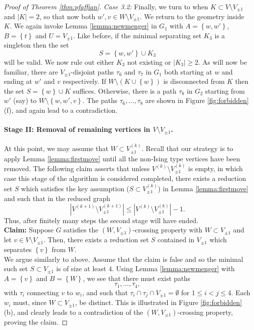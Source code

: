 \documentclass{article}
\numberwithin{equation}{section}
\theoremstyle{definition}
\theoremstyle{definition}
\theoremstyle{remark}
\newcommand{\Vis}{V_{\mathrm{Ising}}}
\renewcommand{\Vis}{V_{\pm 1}}
\renewcommand{\path}{\tau}
\begin{document}
\begin{proof}[Proof of Theorem \ref{thm:pfaffian}]
	\noindent\emph{Case 3.2: }Finally, we turn to when $K \subset V \setminus \Vis$ and $|K| = 2$, so that now both $w',v \in W \setminus \Vis$. 
	We return to the geometry inside $K$. We again invoke Lemma \ref{lemma:newmenger} in $G_1$ with $A = \left\{ w,w' \right\}$, $B = \left\{ t \right\}$ and $U = \Vis$. Like before, if the minimal separating set $K_3$ is a singleton then the set
	\[
	S = \left\{ w,w' \right\} \cup K_3
	\] 
	will be valid. We now rule out either $K_3$ not existing or $|K_3| \geq 2$. As will now be familiar, there are $\Vis$-disjoint paths $\tau_6$ and $\tau_7$ in $G_1$ both starting at $w$ and ending at $w'$ and $v$ respectively.  	
	If $W \setminus (K \cup \left\{ w \right\})$ is disconnected from $K$ then the set $S = \left\{ w \right\} \cup K$ suffices. Otherwise, there is a path $\tau_8$ in $G_2$ starting from $w'$ (say) to $ W \setminus \left\{ w,w',v \right\}$. The paths $\tau_6,\ldots,\tau_8$ are shown in Figure \ref{fig:forbidden} (f), and again lead to a contradiction.
	\paragraph{Stage II: Removal of remaining vertices in $V \setminus \Vis$. }
	At this point, we may assume that $W \subset \Vis^{(k)}$. Recall that our strategy is to apply Lemma \ref{lemma:firstmove} until all the non-Ising type vertices have been removed. The following claim asserts that unless $V^{(k)}\setminus\Vis^{(k)}$ is empty, in which case this stage of the algorithm is considered completed, there exists a reduction set $S$ which satisfies the key assumption ($S \subset \Vis^{(k)}$) in Lemma \ref{lemma:firstmove} and such that in the reduced graph
	\[
		| V^{(k+1)} \setminus \Vis^{(k+1)} | \leq | V^{(k)} \setminus \Vis^{(k)} | - 1.
	\]
	Thus, after finitely many steps the second stage will have ended.
	\\[1em]
	\noindent\textbf{Claim: }Suppose $G$ satisfies the $(W,\Vis)$-crossing property with $W \subset \Vis$ and let $v \in V \setminus \Vis$. Then, there exists a reduction set $S$ contained in $\Vis$ which separates $\left\{ v \right\}$ from $W$.
	\\[1em]
	\noindent We argue similarly to above. Assume that the claim is false and so the minimal such set $S \subset \Vis$ is of size at least $4$. 
	Using Lemma \ref{lemma:newmenger} with $A = \left\{ v \right\}$ and $B  =\left\{ W  \right\}$, we see that there must exist paths
	\[
		\path_1,\ldots,\path_4,
	\]
	with $\path_i$ connecting $v$ to $w_i$, and such that $\tau_i \cap \tau_j \cap \Vis = \emptyset$ for $1 \leq i < j \leq 4$. Each $w_i$ must, since $W \subset \Vis$, be distinct. This is illustrated in Figure \ref{fig:forbidden} (b), and clearly leads to a contradiction of the $(W,\Vis)$-crossing property, proving the claim.

\end{proof}
\end{document}
